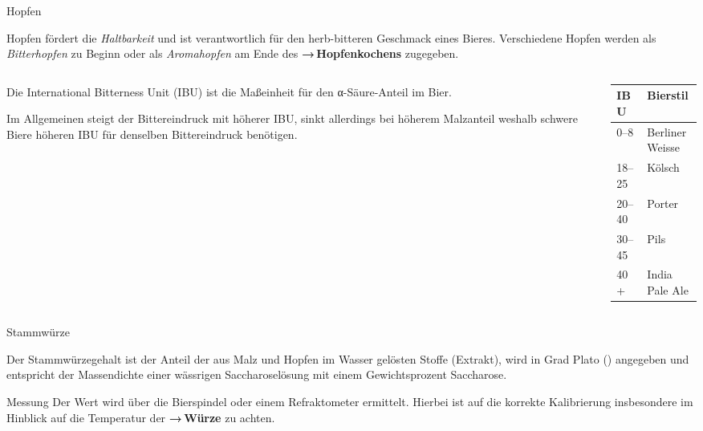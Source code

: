 \documentclass[9pt, ngerman]{beamer}
\newcommand{\forward}[1]{\textbf{→\,#1}}
\begin{document}
\begin{frame}{Hopfen}

  Hopfen fördert die \emph{Haltbarkeit} und ist verantwortlich für den
  herb-bitteren Geschmack eines Bieres. Verschiedene Hopfen werden als
  \emph{Bitterhopfen} zu Beginn oder als \emph{Aromahopfen} am Ende des
  \forward{Hopfenkochens} zugegeben.

  \begin{columns}[onlytextwidth]
    \begin{column}{0.6\textwidth}

      Die International Bitterness Unit (IBU) ist die Maßeinheit für den
      α-Säure-Anteil im Bier.

      Im Allgemeinen steigt der Bittereindruck mit höherer IBU, sinkt allerdings
      bei höherem Malzanteil weshalb schwere Biere höheren IBU für denselben
      Bittereindruck benötigen.

    \end{column}

    \begin{column}{0.4\textwidth}
      \begin{table}
        \begin{tabular}{ll}
          \textbf{IBU} & \textbf{Bierstil}\\
          \midrule
          \numrange{0}{8}   & Berliner Weisse\\
          \numrange{18}{25} & Kölsch\\
          \numrange{20}{40} & Porter\\
          \numrange{30}{45} & Pils\\
          40+               & India Pale Ale\\
        \end{tabular}
      \end{table}
    \end{column}
  \end{columns}

\end{frame}
\begin{frame}{Stammwürze}

  Der Stammwürzegehalt ist der Anteil der aus Malz und Hopfen im Wasser gelösten
  Stoffe (Extrakt), wird in Grad Plato (\si{\dP}) angegeben und entspricht der
  Massendichte einer wässrigen Saccharoselösung mit einem Gewichtsprozent
  Saccharose.

  \begin{block}{Messung}
    \vspace{0.5em}
    Der Wert wird über die Bierspindel oder einem Refraktometer ermittelt.
    Hierbei ist auf die korrekte Kalibrierung insbesondere im Hinblick auf die
    Temperatur der \forward{Würze} zu achten.
  \end{block}
\end{frame}
\end{document}

